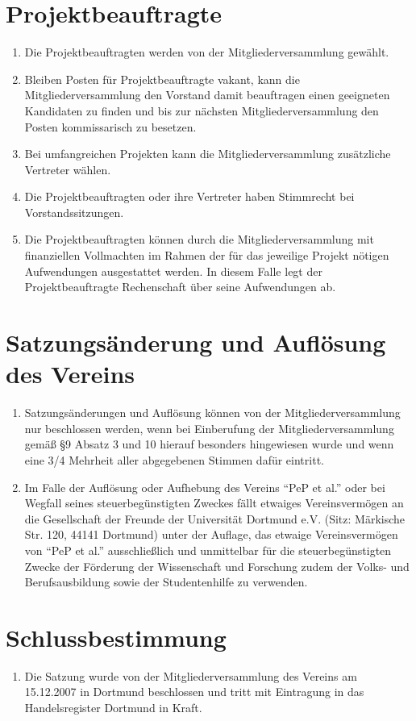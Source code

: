 \documentclass[
  fontsize=12pt,
  paper=a4,
  DIV14,
  parskip,
]{scrartcl}
\begin{document}
\section{Projektbeauftragte}

\begin{enumerate}
	\item Die Projektbeauftragten werden von der Mitgliederversammlung gewählt.
	\item Bleiben Posten für Projektbeauftragte vakant, kann die
		Mitgliederversammlung den Vorstand damit beauftragen einen geeigneten
		Kandidaten zu finden und bis zur nächsten Mitgliederversammlung den Posten
		kommissarisch zu besetzen.
 	\item Bei umfangreichen Projekten kann die Mitgliederversammlung zusätzliche
		Vertreter wählen.
	\item Die Projektbeauftragten oder ihre Vertreter haben Stimmrecht bei
		Vorstandssitzungen.
	\item Die Projektbeauftragten können durch die Mitgliederversammlung mit
		finanziellen Vollmachten im Rahmen der für das jeweilige Projekt nötigen
		Aufwendungen ausgestattet werden. In diesem Falle legt der
		Projektbeauftragte Rechenschaft über seine Aufwendungen ab.
\end{enumerate}

\section{Satzungsänderung und Auflösung des Vereins}

\begin{enumerate}
	\item Satzungsänderungen und Auflösung können von der Mitgliederversammlung
		nur beschlossen werden, wenn bei Einberufung der Mitgliederversammlung
		gemäß §9 Absatz 3 und 10 hierauf besonders hingewiesen wurde und wenn eine
		3/4 Mehrheit aller abgegebenen Stimmen dafür eintritt.
	\item Im Falle der Auflösung oder Aufhebung des Vereins \enquote{PeP et
		al.} oder bei Wegfall seines steuerbegünstigten Zweckes fällt
		etwaiges Vereinsvermögen an die Gesellschaft der Freunde der Universität
		Dortmund e.V. (Sitz: Märkische Str. 120, 44141 Dortmund) unter der Auflage,
		das etwaige Vereinsvermögen von \enquote{PeP et al.} ausschließlich und
		unmittelbar für die steuerbegünstigten Zwecke der Förderung der Wissenschaft
		und Forschung zudem der Volks- und Berufsausbildung sowie der Studentenhilfe
		zu verwenden.
\end{enumerate}

\section{Schlussbestimmung}

\begin{enumerate}
	\item Die Satzung wurde von der Mitgliederversammlung des Vereins am
		15.12.2007 in Dortmund beschlossen und tritt mit Eintragung in das
		Handelsregister Dortmund in Kraft.
\end{enumerate}
\end{document}
